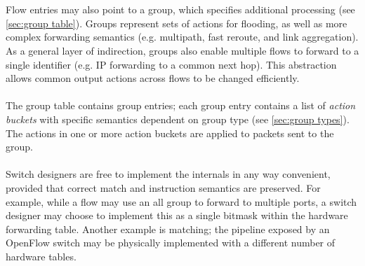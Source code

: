 \documentclass[10pt]{article}
\begin{document}
\\\\
Flow entries may also point to a group, which specifies additional processing (see \ref{sec:group table}). Groups represent sets of actions for flooding, as well as more complex forwarding semantics (e.g. multipath, fast reroute, and link aggregation).  As a general layer of indirection, groups also enable multiple flows to forward to a single identifier (e.g. IP forwarding to a common next hop).  This abstraction allows common output actions across flows to be changed efficiently.
\\\\
The group table contains group entries; each group entry contains a list of \emph{action buckets} with specific semantics dependent on group type (see \ref{sec:group types}). The actions in one or more action buckets are applied to packets sent to the group.
\\\\
Switch designers are free to implement the internals in any way convenient, provided that correct match and instruction semantics are preserved. For example, while a flow may use an all group to forward to multiple ports, a switch designer may choose to implement this as a single bitmask within the hardware forwarding table.  Another example is matching; the pipeline exposed by an OpenFlow switch may be physically implemented with a different number of hardware tables.
\end{document}
